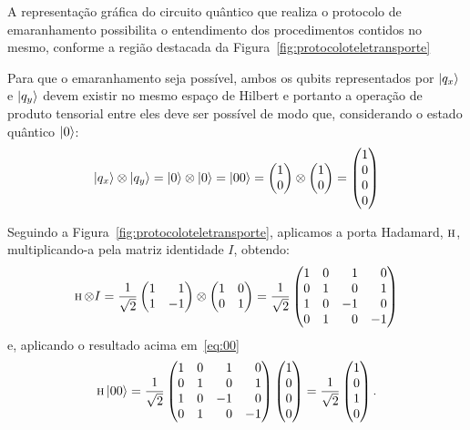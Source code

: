A representação gráfica do circuito quântico que realiza o protocolo de emaranhamento possibilita o entendimento dos procedimentos contidos no mesmo, conforme a região destacada da Figura~\ref{fig:protocoloteletransporte}

Para que o emaranhamento seja possível, ambos os qubits representados por $\ket{q_x}$ e $\ket{q_y}$ devem existir no mesmo espaço de Hilbert e portanto a operação de produto tensorial entre eles deve ser possível de modo que, considerando o estado quântico $\ket{0}$:
\begin{equation}
\ket{q_x} \otimes \ket{q_y} = \ket{0} \otimes \ket{0} = \ket{00} = \begin{pmatrix}
1 \\
0
\end{pmatrix} \otimes \begin{pmatrix}
1 \\
0
\end{pmatrix} = \begin{pmatrix}
1 \\
0 \\
0 \\
0
\end{pmatrix}
\end{equation}

Seguindo a Figura~\ref{fig:protocoloteletransporte}, aplicamos a porta Hadamard, \(\operatorname{\textsc{h}}\), multiplicando-a pela matriz identidade \(I\), obtendo:
\begin{equation}
\HAD \otimes I = \frac{1}{\sqrt{2}} \begin{pmatrix*}[r]
1 & 1 \\
1 & -1
\end{pmatrix*} \otimes \begin{pmatrix}
1 & 0 \\
0 & 1
\end{pmatrix} = \frac{1}{\sqrt{2}} \begin{pmatrix*}[r]
1 & 0 & 1 & 0 \\
0 & 1 & 0 & 1 \\
1 & 0 & -1 & 0 \\
0 & 1 & 0 & -1
\end{pmatrix*}
\end{equation}
e, aplicando o resultado acima em~\eqref{eq:00}
\begin{equation}
\HAD \ket{00} = \frac{1}{\sqrt{2}} \begin{pmatrix*}[r]
1 & 0 & 1 & 0 \\
0 & 1 & 0 & 1 \\
1 & 0 & -1 & 0 \\
0 & 1 & 0 & -1
\end{pmatrix*} \begin{pmatrix}
1 \\
0 \\
0 \\
0
\end{pmatrix} = \frac{1}{\sqrt{2}} \begin{pmatrix}
1 \\
0 \\
1 \\
0
\end{pmatrix}.
\end{equation}

